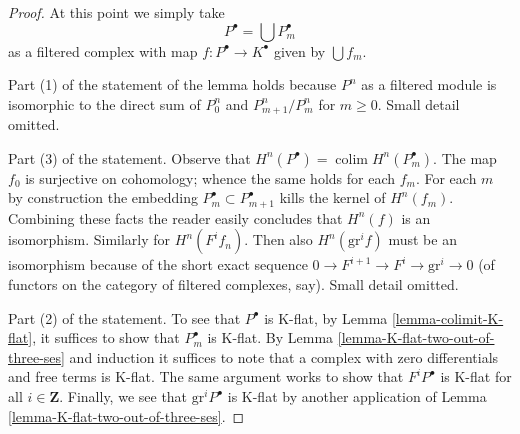 \documentclass[10pt,a4paper]{amsart}
\theoremstyle{plain}
\theoremstyle{definition}
\theoremstyle{remark}
\numberwithin{equation}{subsection}
\def\colim{\mathop{\mathrm{colim}}\nolimits}
\begin{document}
\begin{proof}
\medskip\noindent
At this point we simply take
$$
P^\bullet = \bigcup P_m^\bullet
$$
as a filtered complex with map $f : P^\bullet \to K^\bullet$
given by $\bigcup f_m$.

\medskip\noindent
Part (1) of the statement of the lemma holds because $P^n$
as a filtered module is isomorphic to the direct sum of
$P_0^n$ and $P_{m + 1}^n/P_m^n$ for $m \geq 0$. Small detail omitted.

\medskip\noindent
Part (3) of the statement. Observe that
$H^n(P^\bullet) = \colim H^n(P_m^\bullet)$.
The map $f_0$ is surjective on cohomology; whence the same holds
for each $f_m$. For each $m$ by construction the embedding
$P_m^\bullet \subset P_{m + 1}^\bullet$
kills the kernel of $H^n(f_m)$. Combining these facts the
reader easily concludes that $H^n(f)$ is an isomorphism.
Similarly for $H^n(F^if_n)$. Then also $H^n(\text{gr}^if)$
must be an isomorphism because of the short exact sequence
$0 \to F^{i + 1} \to F^i \to \text{gr}^i \to 0$ (of functors
on the category of filtered complexes, say).
Small detail omitted.

\medskip\noindent
Part (2) of the statement. To see that $P^\bullet$ is K-flat, by
Lemma \ref{lemma-colimit-K-flat}, it suffices to show that $P_m^\bullet$
is K-flat. By Lemma \ref{lemma-K-flat-two-out-of-three-ses}
and induction it suffices to note that a complex with zero differentials
and free terms is K-flat. The same argument works to
show that $F^iP^\bullet$ is K-flat for all $i \in \mathbf{Z}$.
Finally, we see that $\text{gr}^iP^\bullet$ is K-flat by
another application of Lemma \ref{lemma-K-flat-two-out-of-three-ses}.
\end{proof}
\end{document}
